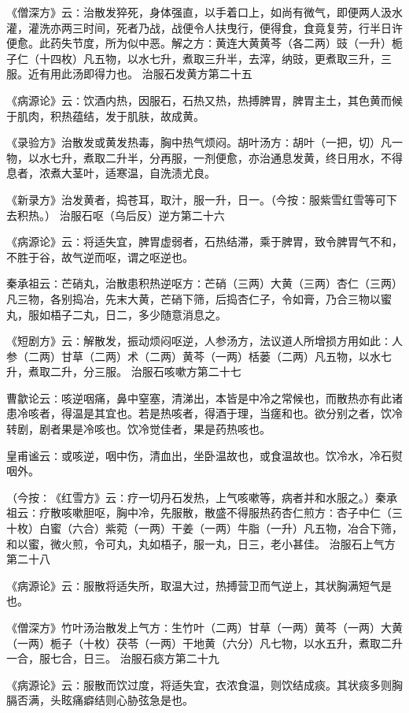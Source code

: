 \documentclass[a4paper,12pt,UTF8,twoside]{ctexbook}
\begin{document}
《僧深方》云∶治散发猝死，身体强直，以手着口上，如尚有微气，即便两人汲水灌，灌洗亦两三时间，死者乃战，战便令人扶曳行，便得食，食竟复劳，行半日许便愈。此药失节度，所为似中恶。解之方∶黄连大黄黄芩（各二两）豉（一升）栀子仁（十四枚）凡五物，以水七升，煮取三升半，去滓，纳豉，更煮取三升，三服。近有用此汤即得力也。
治服石发黄方第二十五

《病源论》云∶饮酒内热，因服石，石热又热，热搏脾胃，脾胃主土，其色黄而候于肌肉，积热蕴结，发于肌肤，故成黄。

《录验方》治散发或黄发热毒，胸中热气烦闷。胡叶汤方∶胡叶（一把，切）凡一物，以水七升，煮取二升半，分再服，一剂便愈，亦治通息发黄，终日用水，不得息者，浓煮大茎叶，适寒温，自洗渍尤良。

《新录方》治发黄者，捣苍耳，取汁，服一升，日一。（今按∶服紫雪红雪等可下去积热。）
治服石呕（乌后反）逆方第二十六

《病源论》云∶将适失宜，脾胃虚弱者，石热结滞，乘于脾胃，致令脾胃气不和，不胜于谷，故气逆而呕，谓之呕逆也。

秦承祖云∶芒硝丸，治散患积热逆呕方∶芒硝（三两）大黄（三两）杏仁（三两）凡三物，各别捣冶，先末大黄，芒硝下筛，后捣杏仁子，令如膏，乃合三物以蜜丸，服如梧子二丸，日二，多少随意消息之。

《短剧方》云∶解散发，振动烦闷呕逆，人参汤方，法议道人所增损方用如此∶人参（二两）甘草（二两）术（二两）黄芩（一两）栝蒌（二两）凡五物，以水七升，煮取二升，分三服。
治服石咳嗽方第二十七

曹歙论云∶咳逆咽痛，鼻中窒塞，清涕出，本皆是中冷之常候也，而散热亦有此诸患冷咳者，得温是其宜也。若是热咳者，得酒于理，当瘥和也。欲分别之者，饮冷转剧，剧者果是冷咳也。饮冷觉佳者，果是药热咳也。

皇甫谧云∶或咳逆，咽中伤，清血出，坐卧温故也，或食温故也。饮冷水，冷石熨咽外。

（今按∶《红雪方》云∶疗一切丹石发热，上气咳嗽等，病者并和水服之。）秦承祖云∶疗散咳嗽胆呕，胸中冷，先服散，散盛不得服热药杏仁煎方∶杏子中仁（三十枚）白蜜（六合）紫菀（一两）干姜（一两）牛脂（一升）凡五物，冶合下筛，和以蜜，微火煎，令可丸，丸如梧子，服一丸，日三，老小甚佳。
治服石上气方第二十八

《病源论》云∶服散将适失所，取温大过，热搏营卫而气逆上，其状胸满短气是也。

《僧深方》竹叶汤治散发上气方∶生竹叶（二两）甘草（一两）黄芩（一两）大黄（一两）栀子（十枚）茯苓（一两）干地黄（六分）凡七物，以水五升，煮取二升一合，服七合，日三。
治服石痰方第二十九

《病源论》云∶服散而饮过度，将适失宜，衣浓食温，则饮结成痰。其状痰多则胸膈否满，头眩痛癖结则心胁弦急是也。
\end{document}
